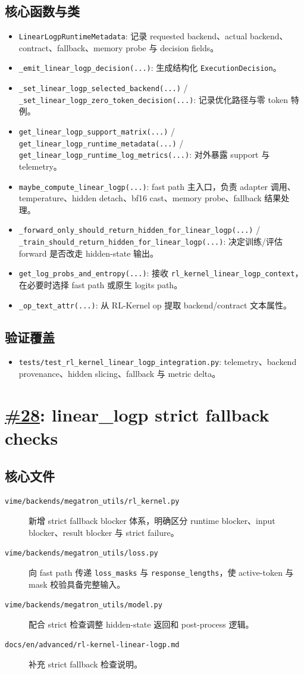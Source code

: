 \documentclass[11pt,a4paper]{ctexart}
\newcommand{\code}[1]{{\small\nolinkurl{#1}}}
\newcommand{\pr}[1]{\href{https://github.com/RL-Align/vime/pull/#1}{\##1}}
\newcommand{\fileitem}[2]{\item[\code{#1}] #2}
\begin{document}
\subsection{核心函数与类}
\begin{itemize}
  \item \code{LinearLogpRuntimeMetadata}: 记录 requested backend、actual backend、contract、fallback、memory probe 与 decision fields。
  \item \code{_emit_linear_logp_decision(...)}: 生成结构化 \code{ExecutionDecision}。
  \item \code{_set_linear_logp_selected_backend(...)} / \code{_set_linear_logp_zero_token_decision(...)}: 记录优化路径与零 token 特例。
  \item \code{get_linear_logp_support_matrix(...)} / \code{get_linear_logp_runtime_metadata(...)} / \code{get_linear_logp_runtime_log_metrics(...)}: 对外暴露 support 与 telemetry。
  \item \code{maybe_compute_linear_logp(...)}: fast path 主入口，负责 adapter 调用、temperature、hidden detach、bf16 cast、memory probe、fallback 结果处理。
  \item \code{_forward_only_should_return_hidden_for_linear_logp(...)} / \code{_train_should_return_hidden_for_linear_logp(...)}: 决定训练/评估 forward 是否改走 hidden-state 输出。
  \item \code{get_log_probs_and_entropy(...)}: 接收 \code{rl_kernel_linear_logp_context}，在必要时选择 fast path 或原生 logits path。
  \item \code{_op_text_attr(...)}: 从 RL-Kernel op 提取 backend/contract 文本属性。
\end{itemize}

\subsection{验证覆盖}
\begin{itemize}
  \item \code{tests/test_rl_kernel_linear_logp_integration.py}: telemetry、backend provenance、hidden slicing、fallback 与 metric delta。
\end{itemize}

\newpage
\section{\pr{28}: linear\_logp strict fallback checks}

\subsection{核心文件}
\begin{description}
  \fileitem{vime/backends/megatron_utils/rl_kernel.py}{新增 strict fallback blocker 体系，明确区分 runtime blocker、input blocker、result blocker 与 strict failure。}
  \fileitem{vime/backends/megatron_utils/loss.py}{向 fast path 传递 \code{loss_masks} 与 \code{response_lengths}，使 active-token 与 mask 校验具备完整输入。}
  \fileitem{vime/backends/megatron_utils/model.py}{配合 strict 检查调整 hidden-state 返回和 post-process 逻辑。}
  \fileitem{docs/en/advanced/rl-kernel-linear-logp.md}{补充 strict fallback 检查说明。}
\end{description}
\end{document}
